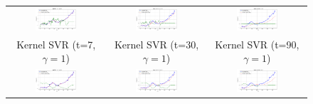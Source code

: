 \documentclass{article}
\begin{document}
\begin{figure}[h]
\begin{tabular}{ccc}
        \includegraphics[width=0.45\textwidth]{kernel7_1.png} &  
        \includegraphics[width=0.45\textwidth]{kernel30_1.png} &  
        \includegraphics[width=0.45\textwidth]{kernel90_1.png} \\

        \small Kernel SVR (t=7, $\gamma=1$) & \small Kernel SVR (t=30, $\gamma=1$) & \small Kernel SVR (t=90, $\gamma=1$) \\

        \includegraphics[width=0.45\textwidth]{kernel7_10.png} &  
        \includegraphics[width=0.45\textwidth]{kernel30_10.png} &  
        \includegraphics[width=0.45\textwidth]{kernel90_10.png} \\


\end{tabular}
\end{figure}
\end{document}
